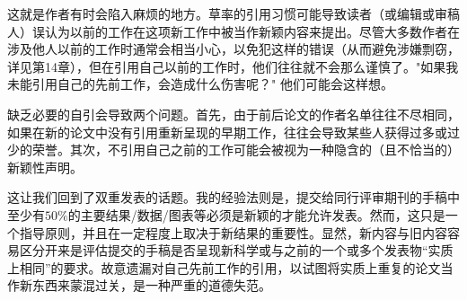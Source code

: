 这就是作者有时会陷入麻烦的地方。草率的引用习惯可能导致读者（或编辑或审稿人）误认为以前的工作在这项新工作中被当作新颖内容来提出。尽管大多数作者在涉及他人以前的工作时通常会相当小心，以免犯这样的错误（从而避免涉嫌剽窃，详见第14章），但在引用自己以前的工作时，他们往往就不会那么谨慎了。"如果我未能引用自己的先前工作，会造成什么伤害呢？" 他们可能会这样想。

缺乏必要的自引会导致两个问题。首先，由于前后论文的作者名单往往不尽相同，如果在新的论文中没有引用重新呈现的早期工作，往往会导致某些人获得过多或过少的荣誉。其次，不引用自己之前的工作可能会被视为一种隐含的（且不恰当的）新颖性声明。

这让我们回到了双重发表的话题。我的经验法则是，提交给同行评审期刊的手稿中至少有$50 \%$的主要结果/数据/图表等必须是新颖的才能允许发表。然而，这只是一个指导原则，并且在一定程度上取决于新结果的重要性。显然，新内容与旧内容容易区分开来是评估提交的手稿是否呈现新科学或与之前的一个或多个发表物“实质上相同”的要求。故意遗漏对自己先前工作的引用，以试图将实质上重复的论文当作新东西来蒙混过关，是一种严重的道德失范。


